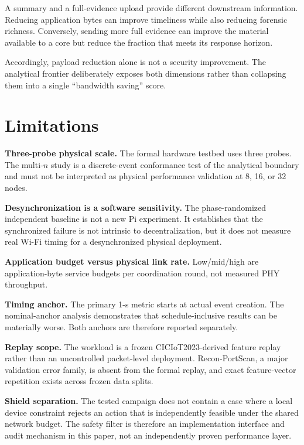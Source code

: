 \documentclass[10pt,journal]{IEEEtran}
\begin{document}
A summary and a full-evidence upload provide different downstream
information. Reducing application bytes can improve timeliness while
also reducing forensic richness. Conversely, sending more full evidence
can improve the material available to a core but reduce the fraction
that meets its response horizon.

Accordingly, payload reduction alone is not a security improvement.
The analytical frontier deliberately exposes both dimensions rather than
collapsing them into a single ``bandwidth saving'' score.

\section{Limitations}
\label{sec:limitations}

\textbf{Three-probe physical scale.}
The formal hardware testbed uses three probes. The multi-$n$ study is a
discrete-event conformance test of the analytical boundary and must not
be interpreted as physical performance validation at 8, 16, or 32 nodes.

\textbf{Desynchronization is a software sensitivity.}
The phase-randomized independent baseline is not a new Pi experiment.
It establishes that the synchronized failure is not intrinsic to
decentralization, but it does not measure real Wi-Fi timing for a
desynchronized physical deployment.

\textbf{Application budget versus physical link rate.}
Low/mid/high are application-byte service budgets per coordination
round, not measured PHY throughput.

\textbf{Timing anchor.}
The primary 1-s metric starts at actual event creation. The nominal-anchor
analysis demonstrates that schedule-inclusive results can be materially
worse. Both anchors are therefore reported separately.

\textbf{Replay scope.}
The workload is a frozen CICIoT2023-derived feature replay rather than an
uncontrolled packet-level deployment. Recon-PortScan, a major validation
error family, is absent from the formal replay, and exact feature-vector
repetition exists across frozen data splits.

\textbf{Shield separation.}
The tested campaign does not contain a case where a local device
constraint rejects an action that is independently feasible under the
shared network budget. The safety filter is therefore an implementation
interface and audit mechanism in this paper, not an independently proven
performance layer.
\end{document}
